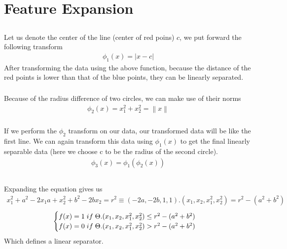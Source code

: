 \documentclass[12pt,onecolumn,a4paper]{article}
\newcommand{\norm}[1]{\left\lVert#1\right\rVert}
\begin{document}
\section{Feature Expansion}
\subsection{}
\subsubsection{}
Let us denote the center of the line (center of red poins) $c$, we put forward the following transform
\begin{align*}
	\phi_1(x) = |x - c|
\end{align*}
After transforming the data using the above function, because the distance of the red points is lower than that of the blue points, they can be linearly separated.
\subsubsection{}
Because of the radius difference of two circles, we can make use of their norms
\begin{align*}
	\phi_2(x) = x_1^2 + x_2^2 = \norm{x}
\end{align*}
\subsubsection{}
If we perform the $\phi_2$ transform on our data, our transformed data will be like the first line. We can again transform this data using $\phi_1(x)$ to get the final linearly separable data (here we choose c to be the radius of the second circle).
\begin{align*}
	\phi_3(x) = \phi_1(\phi_2(x))
\end{align*}
\subsection{}
Expanding the equation gives us
\begin{align*}
	x_1^2 + a^2 - 2x_1a + x_2^2 + b^2 - 2bx_2 = r^2 \equiv (-2a, -2b, 1, 1).(x_1,x_2,x_1^2,x_2^2) = r^2 - (a^2 + b^2)
\end{align*}
\begin{align*}
	\begin{cases}
		f(x) = 1 \hspace{0.1 cm} if \hspace{0.1 cm}\Theta.(x_1,x_2,x_1^2,x_2^2) \leq r^2 - (a^2 + b^2) \\
		f(x) = 0 \hspace{0.1 cm} if \hspace{0.1 cm}\Theta.(x_1,x_2,x_1^2,x_2^2) > r^2 - (a^2 + b^2)
	\end{cases}
\end{align*}
Which defines a linear separator.
\end{document}
